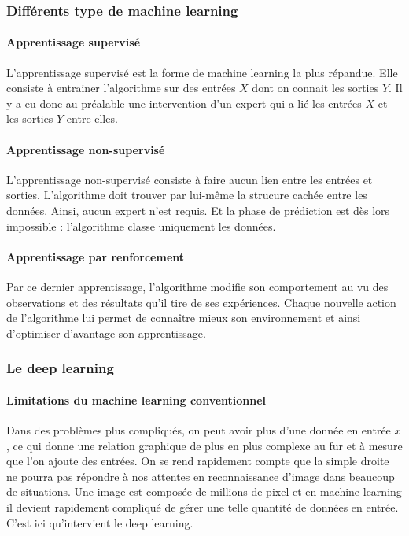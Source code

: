 \subsubsection{Différents type de machine learning}
\paragraph{Apprentissage supervisé}
L'apprentissage supervisé est la forme de machine learning la plus répandue. Elle consiste à entrainer l'algorithme sur des entrées $X$ dont on connait les sorties $Y$. Il y a eu donc au préalable une intervention d'un expert qui a lié les entrées $X$ et les sorties $Y$ entre elles.
\paragraph{Apprentissage non-supervisé}
L'apprentissage non-supervisé consiste à faire aucun lien entre les entrées et sorties. L'algorithme doit trouver par lui-même la strucure cachée entre les données. Ainsi, aucun expert n'est requis. Et la phase de prédiction est dès lors impossible : l'algorithme classe uniquement les données.
\paragraph{Apprentissage par renforcement}
Par ce dernier apprentissage, l'algorithme modifie son comportement au vu des observations et des résultats qu'il tire de ses expériences. Chaque nouvelle action de l'algorithme lui permet de connaître mieux son environnement et ainsi d'optimiser d'avantage son apprentissage.

\subsubsection{Le deep learning}
\paragraph{Limitations du machine learning conventionnel}
Dans des problèmes plus compliqués, on peut avoir plus d’une donnée en entrée $x$, ce qui donne une relation graphique de plus en plus complexe au fur et à mesure que l'on ajoute des entrées. On se rend rapidement compte que la simple droite ne pourra pas répondre à nos attentes en reconnaissance d’image dans beaucoup de situations. Une image est composée de millions de pixel et en machine learning il devient rapidement compliqué de gérer une telle quantité de données en entrée. C'est ici qu'intervient le deep learning.


